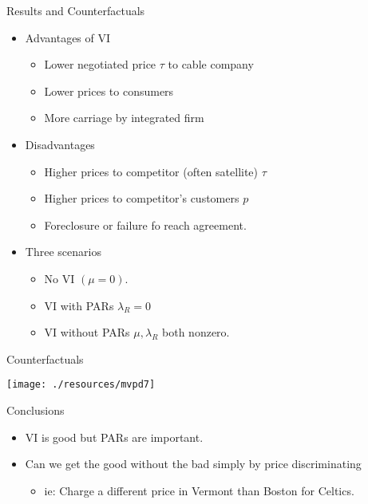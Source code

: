 \begin{frame}{Results and Counterfactuals }
\begin{itemize}
\item Advantages of VI
\begin{itemize}
\item Lower negotiated price $\tau$ to cable company
\item Lower prices to consumers
\item More carriage by integrated firm
\end{itemize}
\item Disadvantages
\begin{itemize}
\item Higher prices to competitor (often satellite) $\tau$
\item Higher prices to competitor's customers $p$
\item Foreclosure or failure fo reach agreement.
\end{itemize}
\item Three scenarios
\begin{itemize}
\item No VI $(\mu=0)$.
\item VI with PARs $\lambda_R =0$
\item VI without PARs $\mu,\lambda_R$ both nonzero.
\end{itemize}
\end{itemize}
\end{frame}

\begin{frame}{Counterfactuals}
\begin{center}
\texttt{[image: ./resources/mvpd7]}
\end{center}
\end{frame}



\begin{frame}{Conclusions}
\begin{itemize}
\item VI is good but PARs are important.
\item Can we get the good without the bad simply by price discriminating
\begin{itemize}
\item ie: Charge a different price in Vermont than Boston for Celtics.
\end{itemize}
\end{itemize}
\end{frame}

